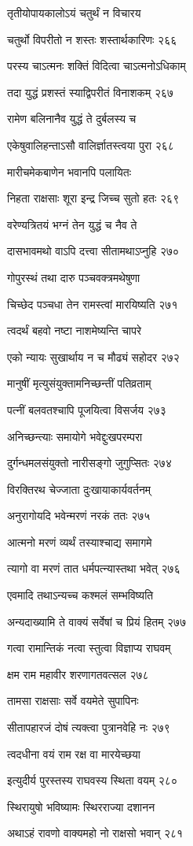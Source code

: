 तृतीयोपायकालोऽयं चतुर्थं न विचारय

चतुर्थो विपरीतो न शस्तः शस्तार्थकारिणः २६६

परस्य चाऽत्मनः शक्तिं विदित्वा चाऽत्मनोऽधिकाम्

तदा युद्धं प्रशस्तं स्याद्विपरीतं विनाशकम् २६७

रामेण बलिनानैव युद्धं ते दुर्बलस्य च

एकेषुवालिहन्ताऽसौ वालिर्ज्ञातस्त्वया पुरा २६८

मारीचमेकबाणेन भवानपि पलायितः

निहता राक्षसाः शूरा इन्द्र जिच्च सुतो हतः २६९

वरेण्यत्रितयं भग्नं तेन युद्धं च नैव ते

दासभावमथो वाऽपि दत्त्वा सीतामथाऽप्नुहि २७०

गोपुरस्थं तथा दारु पञ्चवक्त्रमथेषुणा

चिच्छेद पञ्चधा तेन रामस्त्वां मारयिष्यति २७१

त्वदर्थं बहवो नष्टा नाशमेष्यन्ति चापरे

एको न्यायः सुखार्थाय न च मौढ्यं सहोदर २७२

मानुषीं मृत्युसंयुक्तामनिच्छन्तीं पतिव्रताम्

पत्नीं बलवतश्चापि पूजयित्वा विसर्जय २७३

अनिच्छन्त्याः समायोगे भवेद्दुःखपरम्परा

दुर्गन्धमलसंयुक्तो नारीसङ्गो जुगुप्सितः २७४

विरक्तिरथ चेज्जाता दुःखायाकार्यवर्तनम्

अनुरागोयदि भवेन्मरणं नरकं ततः २७५

आत्मनो मरणं व्यर्थं तस्याश्चाद्य समागमे

त्यागो वा मरणं तात धर्मपत्न्यास्तथा भवेत् २७६

एवमादि तथाऽन्यच्च कश्मलं सम्भविष्यति

अन्यदाख्यामि ते वाक्यं सर्वेषां च प्रियं हितम् २७७

गत्वा रामान्तिकं नत्वा स्तुत्वा विज्ञाप्य राघवम्

क्षम राम महावीर शरणागतवत्सल २७८

तामसा राक्षसाः सर्वे वयमेते सुपापिनः

सीतापहारजं दोषं त्यक्त्वा पुत्रानवेहि नः २७९

त्वदधीना वयं राम रक्ष वा मारयेच्छया

इत्युदीर्य पुरस्तस्य राघवस्य स्थिता वयम् २८०

स्थिरायुषो भविष्यामः स्थिरराज्या दशानन

अथाऽहं रावणो वाक्यमहो नो राक्षसो भवान् २८१

